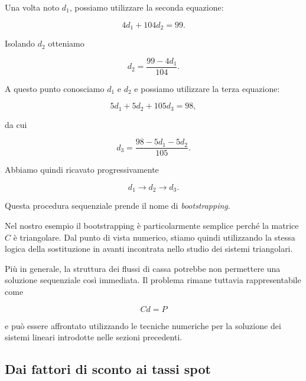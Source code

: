 Una volta noto $d_1$, possiamo utilizzare la seconda equazione:

\begin{equation*}
    4d_1+104d_2=99.
\end{equation*}

Isolando $d_2$ otteniamo

\begin{equation*}
    d_2=
    \frac{99-4d_1}{104}.
    \label{eq:d2-bootstrap}
\end{equation*}

A questo punto conosciamo $d_1$ e $d_2$ e possiamo utilizzare la
terza equazione:

\begin{equation*}
    5d_1+5d_2+105d_3=98,
\end{equation*}

da cui

\begin{equation*}
    d_3=
    \frac{98-5d_1-5d_2}{105}.
    \label{eq:d3-bootstrap}
\end{equation*}

Abbiamo quindi ricavato progressivamente

\begin{equation*}
    d_1
    \longrightarrow
    d_2
    \longrightarrow
    d_3.
\end{equation*}

Questa procedura sequenziale prende il nome di
\emph{bootstrapping}.

Nel nostro esempio il bootstrapping è particolarmente semplice
perché la matrice $C$ è triangolare. Dal punto di vista numerico,
stiamo quindi utilizzando la stessa logica della sostituzione in
avanti incontrata nello studio dei sistemi triangolari.

Più in generale, la struttura dei flussi di cassa potrebbe non
permettere una soluzione sequenziale così immediata. Il problema
rimane tuttavia rappresentabile come

\begin{equation*}
    Cd=P
\end{equation*}

e può essere affrontato utilizzando le tecniche numeriche per la
soluzione dei sistemi lineari introdotte nelle sezioni precedenti.
\fi

\subsection{Dai fattori di sconto ai tassi spot}

